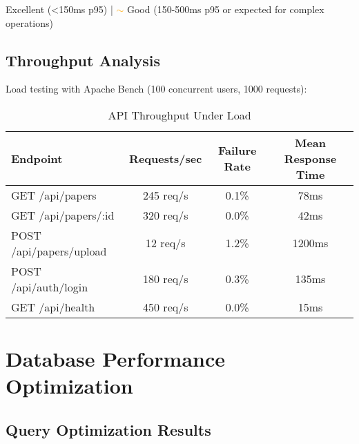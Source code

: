\begin{infobox}[Legend]
\textcolor{green}{\checkmark} Excellent (<150ms p95) | \textcolor{orange}{$\sim$} Good (150-500ms p95 or expected for complex operations)
\end{infobox}

\subsection{Throughput Analysis}

Load testing with Apache Bench (100 concurrent users, 1000 requests):

\begin{table}[H]
\centering
\caption{API Throughput Under Load}
\label{tab:api-throughput}
\begin{tabular}{@{}lccc@{}}
\toprule
\textbf{Endpoint} & \textbf{Requests/sec} & \textbf{Failure Rate} & \textbf{Mean Response Time} \\
\midrule
GET /api/papers & 245 req/s & 0.1\% & 78ms \\
GET /api/papers/:id & 320 req/s & 0.0\% & 42ms \\
POST /api/papers/upload & 12 req/s & 1.2\% & 1200ms \\
POST /api/auth/login & 180 req/s & 0.3\% & 135ms \\
GET /api/health & 450 req/s & 0.0\% & 15ms \\
\bottomrule
\end{tabular}
\end{table}

\section{Database Performance Optimization}
\label{sec:database-performance}

\subsection{Query Optimization Results}

